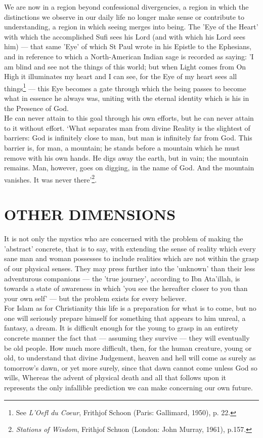 \documentclass[10pt, twoside,openright]{book}
\begin{document}
We are now in a region beyond confessional divergencies, a region in which the distinctions we 
observe in our daily life no longer make sense or contribute to understanding, a region in which 
seeing merges into being. The 'Eye of the Heart' with which the accomplished Sufi sees his Lord (and 
with which his Lord sees him) --- that same 'Eye' of which St Paul wrote in his Epistle to the 
Ephesians, and in reference to which a North\hyp{}American Indian sage is recorded as saying: 'I am blind 
and see not the things of this world; but when Light comes from On High it illuminates my heart and I 
can see, for the Eye of my heart sees all things\footnote{See \emph{L'Oefl du Coeur}, Frithjof Schoon (Paris: Gallimard, 1950), p. 22.} --- this Eye becomes a gate through which the 
being passes to become what in essence he always was, uniting with the eternal identity which is his 
in the Presence of God. \\

He can never attain to this goal through his own efforts, but he can never attain to it without 
effort. `What separates man from divine Reality is the slightest of barriers: God is infinitely close 
to man, but man is infinitely far from God. This barrier is, for man, a mountain; he stands before a 
mountain which he must remove with his own hands. He digs away the earth, but in vain; the mountain 
remains. Man, however, goes on digging, in the name of God. And the mountain vanishes. It was never 
there'\footnote{\emph{Stations of Wisdom}, Frithjof Schuon (London: John Murray, 1961), p.157.}. \\


\chapter{OTHER DIMENSIONS}

It is not only the mystics who are concerned with the problem of making the 'abstract' concrete, that 
is to say, with extending the sense of reality which every sane man and woman possesses to include 
realities which are not within the grasp of our physical senses. They may press further into the 
'unknown' than their less adventurous companions --- the 'true journey', according to Ibn Ata'illah, is 
towards a state of awareness in which 'you see the hereafter closer to you than your own self' --- but 
the problem exists for every believer. \\

For Islam as for Christianity this life is a preparation for what is to come, but no one will 
seriously prepare himself for something that appears to him unreal, a fantasy, a dream. It is 
difficult enough for the young to grasp in an entirety concrete manner the fact that --- assuming they 
survive --- they will eventually be old people. How much more difficult, then, for the human creature, 
young or old, to understand that divine Judgement, heaven and hell will come as surely as tomorrow's 
dawn, or yet more surely, since that dawn cannot come unless God so wills, Whereas the advent of 
physical death and all that follows upon it represents the only infallible prediction we can make 
concerning our own future. \\
\end{document}
